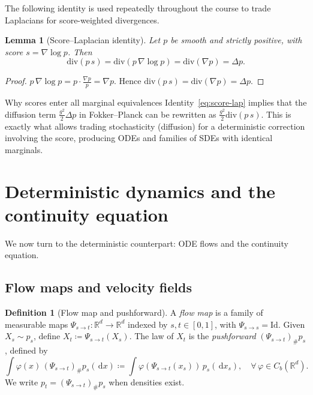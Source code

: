 \documentclass[11pt]{article}
\newcommand{\R}{\mathbb{R}}
\newcommand{\grad}{\nabla}
\newcommand{\diver}{\mathrm{div}}
\newcommand{\dd}{\,\mathrm{d}}
\newtheorem{lemma}[theorem]{Lemma}
\theoremstyle{definition}
\newtheorem{definition}[theorem]{Definition}
\theoremstyle{remark}
\begin{document}
The following identity is used repeatedly throughout the course to trade Laplacians for score-weighted divergences.

\begin{lemma}[Score--Laplacian identity]\label{lem:score-lap}
Let $p$ be smooth and strictly positive, with score $s = \grad\log p$.
Then
\begin{equation}\label{eq:score-lap}
\diver(p\,s) = \diver(p\,\grad\log p) = \diver(\grad p) = \Delta p.
\end{equation}
\end{lemma}

\begin{proof}
$p\,\grad\log p = p \cdot \frac{\grad p}{p} = \grad p$.
Hence $\diver(p\,s) = \diver(\grad p) = \Delta p$.
\end{proof}

\begin{insightbox}{Why scores enter all marginal equivalences}
Identity~\eqref{eq:score-lap} implies that the diffusion term $\frac{g^2}{2}\Delta p$ in Fokker--Planck can be rewritten as $\frac{g^2}{2}\diver(p\,s)$.
This is exactly what allows trading stochasticity (diffusion) for a deterministic correction involving the score, producing ODEs and families of SDEs with identical marginals.
\end{insightbox}

\section{Deterministic dynamics and the continuity equation}\label{sec:ode-cont}

We now turn to the deterministic counterpart: ODE flows and the continuity equation.

\subsection{Flow maps and velocity fields}

\begin{definition}[Flow map and pushforward]\label{def:flow-map}
A \emph{flow map} is a family of measurable maps $\Psi_{s\to t}:\R^d\to\R^d$ indexed by $s,t\in[0,1]$, with $\Psi_{s\to s} = \mathrm{Id}$.
Given $X_s \sim p_s$, define $X_t \coloneqq \Psi_{s\to t}(X_s)$.
The law of $X_t$ is the \emph{pushforward} $(\Psi_{s\to t})_\# p_s$, defined by
\[
\int \varphi(x)\,(\Psi_{s\to t})_\# p_s(\dd x) \coloneqq \int \varphi(\Psi_{s\to t}(x_s))\,p_s(\dd x_s), \quad \forall\,\varphi\in C_b(\R^d).
\]
We write $p_t = (\Psi_{s\to t})_\# p_s$ when densities exist.
\end{definition}
\end{document}
